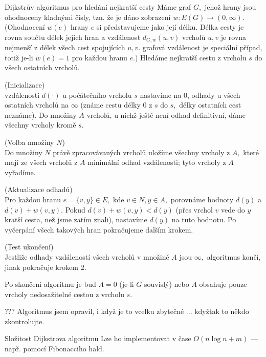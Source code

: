 \begin{algoritmusN}{Dijkstrův algoritmus pro hledání nejkratší cesty}
Máme graf $G,$ jehož hrany jsou ohodnoceny kladnými čísly, tzn. že je dáno zobrazení $w: E(G) \to (0,\infty).$ (Ohodnocení $w(e)$ hrany $e$ si představujeme jako její délku. Délka cesty je rovna součtu délek jejích hran a vzdálenost $d_{G,w}(u,v)$ vrcholů $u,v$ je rovna nejmenší z délek všech cest spojujících $u,v.$  grafová vzdálenost je speciální případ, totiž je-li $w(e)=1$ pro každou hranu $e.$) Hledáme nejkratší cestu z vrcholu $s$ do všech ostatních vrcholů.
\begin{penumerate}
\item (Inicializace) \hfil \\
     vzdálenosti $d(\cdot)$ u počátečního vrcholu $s$ nastavíme na 0,
    odhady u všech ostatních vrcholů na $\infty$ (známe cestu délky 0 z $s$ do
    $s,$ délky ostatních cest neznáme). Do množiny $A$ vrcholů, u nichž
    ještě není odhad definitivní, dáme všechny vrcholy kromě $s$.
\item (Volba množiny $N$) \hfil \\
    Do množiny $N$ právě zpracovávaných vrcholů uložíme všechny vrcholy z $A,$ které mají ze všech vrcholů z $A$ minimální odhad vzdálenosti; tyto vrcholy z $A$ vyřadíme.
\item (Aktualizace odhadů) \hfil \\
    Pro každou hranu $e=\{v,y\} \in E,$ kde $v \in N, y\in A,$ porovnáme hodnoty $d(y)$ a $d(v)+w({v,y}).$ Pokud $d(v)+w({v,y}) < d(y)$ (přes vrchol $v$ vede do $y$ kratší cesta, než jsme zatím znali), nastavíme $d(y)$ na tuto hodnotu. Po vyčerpání všech takových hran pokračujeme dalším krokem.
\item (Test ukončení) \hfil \\
    Jestliže odhady vzdáleností všech vrcholů v množině $A$ jsou $\infty,$ algoritmus končí, jinak pokračuje krokem 2.
\end{penumerate}
Po skončení algoritmu je buď $A = 0$ (je-li $G$ souvislý) nebo $A$ obsahuje pouze vrcholy nedosažitelné cestou z vrcholu $s.$

??? Algoritmus jsem opravil, i když je to vcelku zbytečné ... kdyžtak to někdo zkontrolujte. %
\end{algoritmusN}

\begin{vetaN}{Složitost Dijkstrova algoritmu}
Lze ho implementovat v čase $O(n \log n + m)$ --- např. pomocí Fibonacciho hald.
\end{vetaN}

